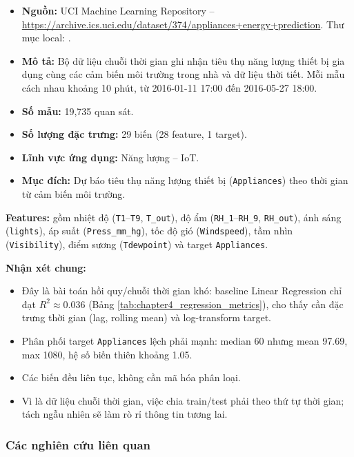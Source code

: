 \begin{itemize}
 \item \textbf{Nguồn:} UCI Machine Learning Repository -- \url{https://archive.ics.uci.edu/dataset/374/appliances+energy+prediction}. Thư mục local: .
 \item \textbf{Mô tả:} Bộ dữ liệu chuỗi thời gian ghi nhận tiêu thụ năng lượng thiết bị gia dụng cùng các cảm biến môi trường trong nhà và dữ liệu thời tiết. Mỗi mẫu cách nhau khoảng 10 phút, từ 2016-01-11 17:00 đến 2016-05-27 18:00.
 \item \textbf{Số mẫu:} 19,735 quan sát.
 \item \textbf{Số lượng đặc trưng:} 29 biến (28 feature, 1 target).
 \item \textbf{Lĩnh vực ứng dụng:} Năng lượng -- IoT.
 \item \textbf{Mục đích:} Dự báo tiêu thụ năng lượng thiết bị (\texttt{Appliances}) theo thời gian từ cảm biến môi trường.
\end{itemize}

\textbf{Features:} gồm nhiệt độ (\texttt{T1}--\texttt{T9}, \texttt{T\_out}), độ ẩm (\texttt{RH\_1}--\texttt{RH\_9}, \texttt{RH\_out}), ánh sáng (\texttt{lights}), áp suất (\texttt{Press\_mm\_hg}), tốc độ gió (\texttt{Windspeed}), tầm nhìn (\texttt{Visibility}), điểm sương (\texttt{Tdewpoint}) và target \texttt{Appliances}.

\textbf{Nhận xét chung:}
\begin{itemize}
 \item Đây là bài toán hồi quy/chuỗi thời gian khó: baseline Linear Regression chỉ đạt $R^2 \approx 0.036$ (Bảng \ref{tab:chapter4_regression_metrics}), cho thấy cần đặc trưng thời gian (lag, rolling mean) và log-transform target.
 \item Phân phối target \texttt{Appliances} lệch phải mạnh: median 60 nhưng mean 97.69, max 1080, hệ số biến thiên khoảng 1.05.
 \item Các biến đều liên tục, không cần mã hóa phân loại.
 \item Vì là dữ liệu chuỗi thời gian, việc chia train/test phải theo thứ tự thời gian; tách ngẫu nhiên sẽ làm rò rỉ thông tin tương lai.
\end{itemize}

\subsubsection{Các nghiên cứu liên quan}

